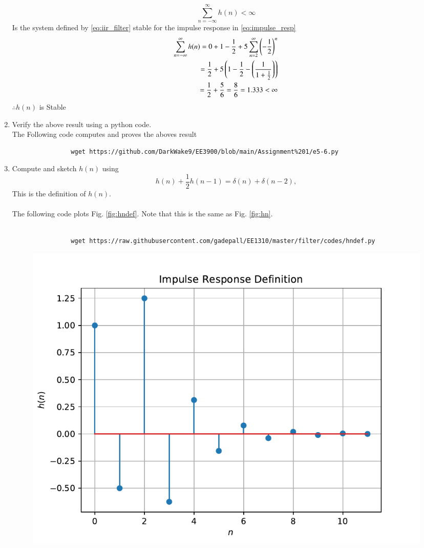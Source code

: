 \documentclass[journal,12pt,twocolumn]{IEEEtran}
\renewcommand\thesection{\arabic{section}}
\begin{document}
\begin{enumerate}[label=\thesection.\arabic*]
\begin{equation}
				\sum_{n=-\infty}^{\infty}h(n) < \infty
			\end{equation}
			Is the system defined by \eqref{eq:iir_filter} stable for the impulse response in \eqref{eq:impulse_resp}\\
			\solution
			\begin{align}
				\sum_{n=-\infty}^{\infty}h(n) = 0 + 1 - \frac{1}{2} + 5\sum_{n=2}^{\infty} \left(-\dfrac{1}{2}\right)^{n}\\
				= \dfrac{1}{2} + 5\left(1 - \dfrac{1}{2} - \left(\dfrac{1}{1 + \tfrac{1}{2}}\right)\right)\\
				= \dfrac{1}{2} + \dfrac{5}{6} = \dfrac{8}{6} = 1.333 < \infty
			\end{align}
			$\therefore h(n)$  is Stable\\
			\item Verify the above result using a python code.\\
			\solution The Following code computes and proves the aboves result
			\begin{lstlisting}
				wget https://github.com/DarkWake9/EE3900/blob/main/Assignment%201/e5-6.py
			\end{lstlisting}
			\item 
			Compute and sketch $h(n)$ using 
			\begin{equation}
				\label{eq:iir_filter_h}
				h(n) + \frac{1}{2}h(n-1) = \delta(n) + \delta(n-2), 
			\end{equation}
			This is the definition of $h(n)$.
			\\\\
			\solution The following code plots Fig. \ref{fig:hndef}. Note that this is the same as Fig. \ref{fig:hn}. \\\\
			\begin{lstlisting}
				wget https://raw.githubusercontent.com/gadepall/EE1310/master/filter/codes/hndef.py
			\end{lstlisting}
			\begin{figure}[!ht]
				\centering
				\includegraphics[width=\columnwidth]{./figs/hndef}

\end{figure}
\end{enumerate}
\end{document}
